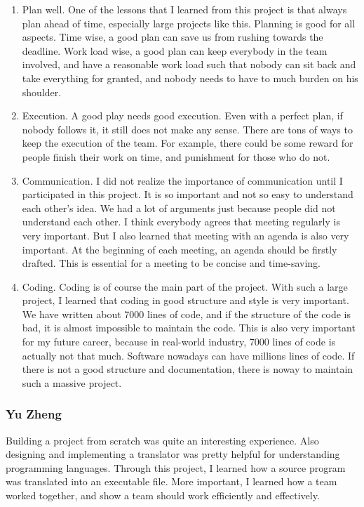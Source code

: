 \begin{enumerate}
\item
Plan well. One of the lessons that I learned from this project is that always plan ahead of
time, especially large projects like this. Planning is good for all aspects. Time wise, a good
plan can save us from rushing towards the deadline. Work load wise, a good plan can keep
everybody in the team involved, and have a reasonable work load such that nobody can sit back
and take everything for granted, and nobody needs to have to much burden on his shoulder. 
\item
Execution. A good play needs good execution. Even with a perfect plan, if nobody follows it,
it still does not make any sense. There are tons of ways to keep the execution of the team. For
example, there could be some reward for people finish their work on time, and punishment for
those who do not. 
\item
Communication. I did not realize the importance of communication until I participated in this
project. It is so important and not so easy to understand each other’s idea. We had a lot of
arguments just because people did not understand each other. I think everybody agrees that
meeting regularly is very important. But I also learned that meeting with an agenda is also very
important. At the beginning of each meeting, an agenda should be firstly drafted. This is
essential for a meeting to be concise and time-saving.
\item
Coding. Coding is of course the main part of the project. With such a large project, I
learned that coding in good structure and style is very important. We have written about 7000
lines of code, and if the structure of the code is bad, it is almost impossible to maintain the
code. This is also very important for my future career, because in real-world industry, 7000
lines of code is actually not that much. Software nowadays can have millions lines of code. If
there is not a good structure and documentation, there is noway to maintain such a massive
project. 
\end{enumerate}

\subsubsection{Yu Zheng}

Building a project from scratch was quite an interesting experience. Also designing and
implementing a translator was pretty helpful for understanding programming languages. Through
this project, I learned how a source program was translated into an executable  file. More
important,  I learned how a team worked together, and show a team should work efficiently and
effectively.

